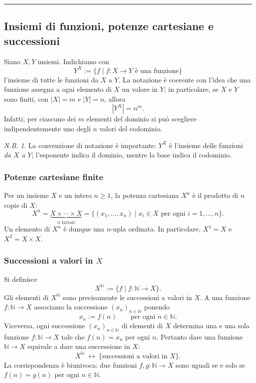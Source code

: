 \documentclass[11pt,a4paper]{article}
\theoremstyle{definition}
\theoremstyle{plain}
\theoremstyle{remark}
\newtheorem*{nb}{N.B.}
\begin{document}
\bigskip\hrule\bigskip


\subsection{Insiemi di funzioni, potenze cartesiane e successioni}

Siano $X,Y$ insiemi. Indichiamo con
\[
Y^X:=\{f\mid f\colon X\to Y\text{ è una funzione}\}
\]
l'insieme di tutte le funzioni da $X$ a $Y$. La notazione è coerente con l'idea che una funzione assegna a ogni elemento di $X$ un valore in $Y$; in particolare, se $X$ e $Y$ sono finiti, con $|X|=m$ e $|Y|=n$, allora
\[
|Y^X|=n^m.
\]
Infatti, per ciascuno dei $m$ elementi del dominio si può scegliere indipendentemente uno degli $n$ valori del codominio.

\begin{nb}
La convenzione di notazione è importante: $Y^X$ è l'insieme delle funzioni \emph{da $X$ a $Y$}; l'esponente indica il dominio, mentre la base indica il codominio.
\end{nb}

\subsubsection*{Potenze cartesiane finite}

Per un insieme $X$ e un intero $n\geq 1$, la potenza cartesiana $X^n$ è il prodotto di $n$ copie di $X$:
\[
X^n=\underbrace{X\times\cdots\times X}_{n\text{ fattori}}
=\{(x_1,\ldots,x_n)\mid x_i\in X\text{ per ogni }i=1,\ldots,n\}.
\]
Un elemento di $X^n$ è dunque una $n$-upla ordinata. In particolare, $X^1=X$ e $X^2=X\times X$.

\subsubsection*{Successioni a valori in $X$}

Si definisce
\[
X^{\mathbb N}:=\{f\mid f\colon\mathbb N\to X\}.
\]
Gli elementi di $X^{\mathbb N}$ sono precisamente le successioni a valori in $X$. A una funzione $f\colon\mathbb N\to X$ associamo la successione $(x_n)_{n\in\mathbb N}$ ponendo
\[
x_n:=f(n)\qquad\text{per ogni }n\in\mathbb N.
\]
Viceversa, ogni successione $(x_n)_{n\in\mathbb N}$ di elementi di $X$ determina una e una sola funzione $f\colon\mathbb N\to X$ tale che $f(n)=x_n$ per ogni $n$. Pertanto dare una funzione $\mathbb N\to X$ equivale a dare una successione in $X$:
\[
X^{\mathbb N}\ \longleftrightarrow\ \{\text{successioni a valori in }X\}.
\]
La corrispondenza è biunivoca: due funzioni $f,g\colon\mathbb N\to X$ sono uguali se e solo se $f(n)=g(n)$ per ogni $n\in\mathbb N$.
\end{document}
